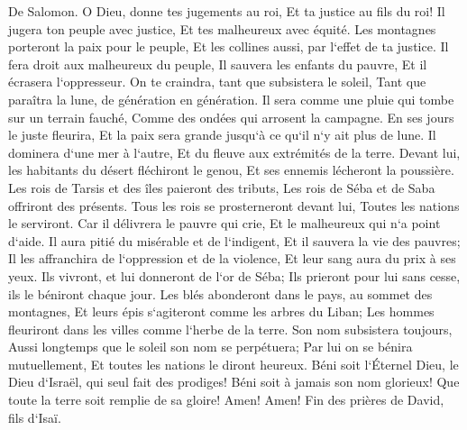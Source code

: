 \verse De Salomon. O Dieu, donne tes jugements au roi, Et ta justice au fils du roi! 
\verse Il jugera ton peuple avec justice, Et tes malheureux avec équité. 
\verse Les montagnes porteront la paix pour le peuple, Et les collines aussi, par l`effet de ta justice. 
\verse Il fera droit aux malheureux du peuple, Il sauvera les enfants du pauvre, Et il écrasera l`oppresseur. 
\verse On te craindra, tant que subsistera le soleil, Tant que paraîtra la lune, de génération en génération. 
\verse Il sera comme une pluie qui tombe sur un terrain fauché, Comme des ondées qui arrosent la campagne. 
\verse En ses jours le juste fleurira, Et la paix sera grande jusqu`à ce qu`il n`y ait plus de lune. 
\verse Il dominera d`une mer à l`autre, Et du fleuve aux extrémités de la terre. 
\verse Devant lui, les habitants du désert fléchiront le genou, Et ses ennemis lécheront la poussière. 
\verse Les rois de Tarsis et des îles paieront des tributs, Les rois de Séba et de Saba offriront des présents. 
\verse Tous les rois se prosterneront devant lui, Toutes les nations le serviront. 
\verse Car il délivrera le pauvre qui crie, Et le malheureux qui n`a point d`aide. 
\verse Il aura pitié du misérable et de l`indigent, Et il sauvera la vie des pauvres; 
\verse Il les affranchira de l`oppression et de la violence, Et leur sang aura du prix à ses yeux. 
\verse Ils vivront, et lui donneront de l`or de Séba; Ils prieront pour lui sans cesse, ils le béniront chaque jour. 
\verse Les blés abonderont dans le pays, au sommet des montagnes, Et leurs épis s`agiteront comme les arbres du Liban; Les hommes fleuriront dans les villes comme l`herbe de la terre. 
\verse Son nom subsistera toujours, Aussi longtemps que le soleil son nom se perpétuera; Par lui on se bénira mutuellement, Et toutes les nations le diront heureux. 
\verse Béni soit l`Éternel Dieu, le Dieu d`Israël, qui seul fait des prodiges! 
\verse Béni soit à jamais son nom glorieux! Que toute la terre soit remplie de sa gloire! Amen! Amen! 
\verse Fin des prières de David, fils d`Isaï. 

\chapter{}

